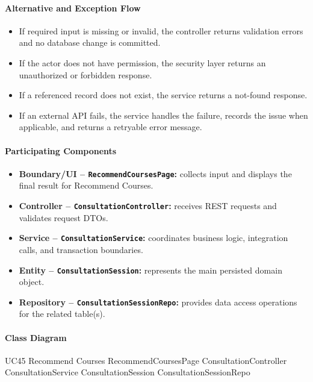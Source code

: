 \paragraph{Alternative and Exception Flow}

\begin{itemize}
    \item If required input is missing or invalid, the controller returns validation errors and no database change is committed.
    \item If the actor does not have permission, the security layer returns an unauthorized or forbidden response.
    \item If a referenced record does not exist, the service returns a not-found response.
    \item If an external API fails, the service handles the failure, records the issue when applicable, and returns a retryable error message.
\end{itemize}

\paragraph{Participating Components}

\begin{itemize}
    \item \textbf{Boundary/UI -- \texttt{RecommendCoursesPage}:} collects input and displays the final result for Recommend Courses.
    \item \textbf{Controller -- \texttt{ConsultationController}:} receives REST requests and validates request DTOs.
    \item \textbf{Service -- \texttt{ConsultationService}:} coordinates business logic, integration calls, and transaction boundaries.
    \item \textbf{Entity -- \texttt{ConsultationSession}:} represents the main persisted domain object.
    \item \textbf{Repository -- \texttt{ConsultationSessionRepo}:} provides data access operations for the related table(s).
\end{itemize}

\paragraph{Class Diagram}

\ClassDiagram
{UC45 Recommend Courses}
{RecommendCoursesPage}
{ConsultationController}
{ConsultationService}
{ConsultationSession}
{ConsultationSessionRepo}

